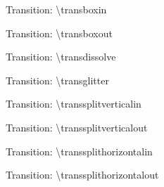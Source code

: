 \documentclass[english,sectioncirclenumberstyle]{ciadbeamer}
\begin{document}
\begin{frame}[c]{Transition: {\textbackslash}transboxin}
	\transboxin
	\begin{center}
	\end{center}
\end{frame}

\begin{frame}[c]{Transition: {\textbackslash}transboxout}
	\transboxout
	\begin{center}
	\end{center}
\end{frame}

\begin{frame}[c]{Transition: {\textbackslash}transdissolve}
	\transdissolve
	\begin{center}
	\end{center}
\end{frame}

\begin{frame}[c]{Transition: {\textbackslash}transglitter}
	\transglitter
	\begin{center}
	\end{center}
\end{frame}

\begin{frame}[c]{Transition: {\textbackslash}transsplitverticalin}
	\transsplitverticalin
	\begin{center}
	\end{center}
\end{frame}

\begin{frame}[c]{Transition: {\textbackslash}transsplitverticalout}
	\transsplitverticalout
	\begin{center}
	\end{center}
\end{frame}

\begin{frame}[c]{Transition: {\textbackslash}transsplithorizontalin}
	\transsplithorizontalin
	\begin{center}
	\end{center}
\end{frame}

\begin{frame}[c]{Transition: {\textbackslash}transsplithorizontalout}
	\transsplithorizontalout
	\begin{center}
	\end{center}
\end{frame}
\end{document}

